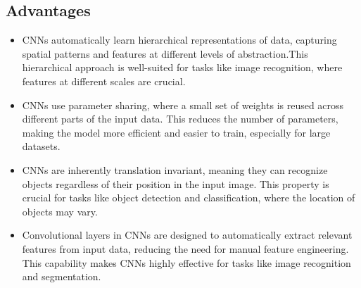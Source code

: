 \documentclass[12pt, a4paper]{report}
\begin{document}
\subsection{Advantages}
\begin{itemize}
    \item \text CNNs automatically learn hierarchical representations of data, capturing spatial patterns and features at different levels of abstraction.This hierarchical approach is well-suited for tasks like image recognition, where features at different scales are crucial.
    \item \text CNNs use parameter sharing, where a small set of weights is reused across different parts of the input data. This reduces the number of parameters, making the model more efficient and easier to train, especially for large datasets.
    \item \text CNNs are inherently translation invariant, meaning they can recognize objects regardless of their position in the input image. This property is crucial for tasks like object detection and classification, where the location of objects may vary.
    \item \text Convolutional layers in CNNs are designed to automatically extract relevant features from input data, reducing the need for manual feature engineering. This capability makes CNNs highly effective for tasks like image recognition and segmentation.
\end{itemize}
\end{document}
